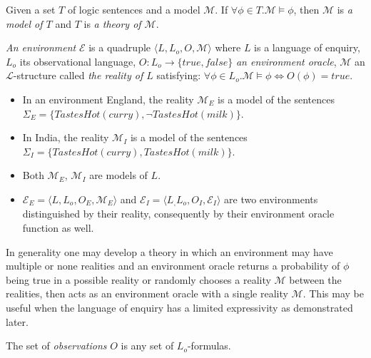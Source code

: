 \begin{defn}
Given a set $T$ of logic sentences and a model $\mathcal{M}$. If $\forall \phi \in T. \mathcal{M} \models \phi$, then $\mathcal{M}$ is \emph{a model of $T$} and $T$ is \emph{a theory of $\mathcal{M}$}.
\end{defn}

\begin{defn}
\emph{An environment} $\mathcal{E}$ is a quadruple $\langle L, L_o, O, \mathcal{M} \rangle$ where $L$ is a language of enquiry, $L_o$ its observational language, $O:L_o \to \{true, false\}$ \emph{an environment oracle}, $\mathcal{M}$ an $\mathcal{L}$-structure called \emph{the reality of $L$} satisfying:
$\forall \phi \in L_o. \mathcal{M} \models \phi \iff O(\phi)=true$.
\end{defn}

\begin{exmp}
\begin{itemize}
\item In an environment England, the reality $\mathcal{M}_E$ is a model of the sentences\\ $\Sigma_E=\{TastesHot(curry), \neg TastesHot(milk)\}$.
\item In India, the reality $\mathcal{M}_I$ is a model of the sentences\\ $\Sigma_I=\{TastesHot(curry), TastesHot(milk)\}$.
\item Both $\mathcal{M}_E$, $\mathcal{M}_I$ are models of $L$.
\item $\mathcal{E}_E=\langle L, L_o, O_E, \mathcal{M}_E \rangle$ and
$\mathcal{E}_I=\langle L_, L_o, O_I, \mathcal{E}_I \rangle$ are two environments distinguished by their reality, consequently by their environment oracle function as well.
\end{itemize}
\end{exmp}

\begin{remark}
In generality one may develop a theory in which an environment may have multiple or none realities and an environment oracle returns a probability of $\phi$ being true in a possible reality or randomly chooses a reality $\mathcal{M}$ between the realities, then acts as an environment oracle with a single reality $\mathcal{M}$. This may be useful when the language of enquiry has a limited expressivity as demonstrated later.
\end{remark}

\begin{defn}
The set of \emph{observations} $O$ is any set of $L_o$-formulas.
\end{defn}

